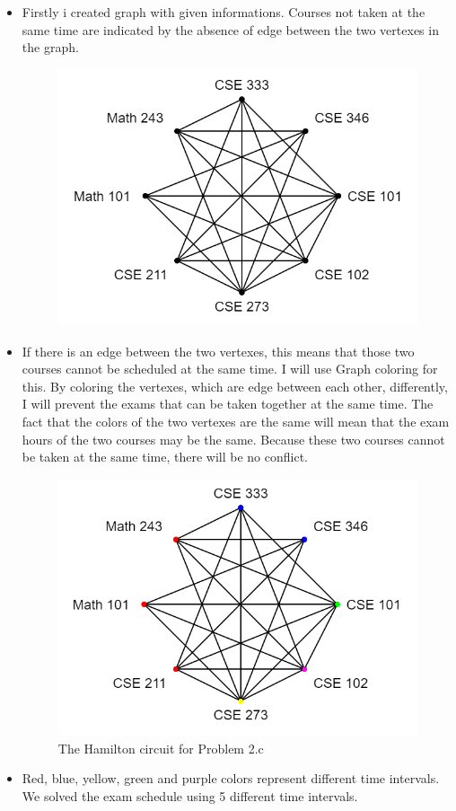 \documentclass[a4 paper]{article}
\numberwithin{equation}{section}
\newcommand{\0}{\mathbf{0}}
\begin{document}
\begin{itemize}
    \item Firstly i created graph with given informations. Courses not taken at the same time are indicated by the absence of edge between the two vertexes in the graph.
    \begin{figure}[h]
    	\centering
    	\includegraphics[scale=0.4]{q3-step1.png}
    \end{figure}
    \item If there is an edge between the two vertexes, this means that those two courses cannot be scheduled at the same time. I will use Graph coloring for this. By coloring the vertexes, which are edge between each other, differently, I will prevent the exams that can be taken together at the same time. The fact that the colors of the two vertexes are the same will mean that the exam hours of the two courses may be the same. Because these two courses cannot be taken at the same time, there will be no conflict.
        \begin{figure}[h]
        	\centering
        	\includegraphics[scale=0.5]{q3-step2.png}
        	\caption{The Hamilton circuit for Problem 2.c}
        \end{figure}
    \item Red, blue, yellow, green and purple colors represent different time intervals. We solved the exam schedule using 5 different time intervals.
\end{itemize}
\end{document}
